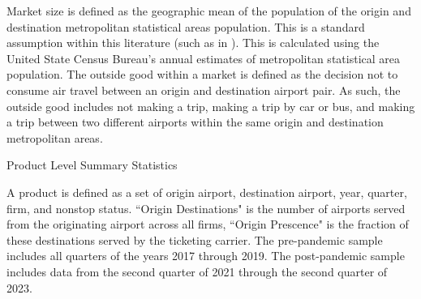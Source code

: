 \documentclass{article}
\begin{document}
	Market size is defined as the geographic mean of the population of the origin and destination metropolitan statistical areas population. This is a standard assumption within this literature (such as in \citep{ciliberto_market_2021}). This is calculated using the United State Census Bureau's annual estimates of metropolitan statistical area population. The outside good within a market is defined as the decision not to consume air travel between an origin and destination airport pair. As such, the outside good includes not making a trip, making a trip by car or bus, and making a trip between two different airports within the same origin and destination metropolitan areas. 
    

    \begin{table}
    \caption{Product Level Summary Statistics}
    \label{tab:Summary_Statistics_Product}
                    \vspace{-15mm}
                    \begin{center}
    
    \footnotesize{A product is defined as a set of origin airport, destination airport, year, quarter, firm, and nonstop status. ``Origin Destinations" is the number of airports served from the originating airport across all firms, ``Origin Prescence" is the fraction of these destinations served by the ticketing carrier. The pre-pandemic sample includes all quarters of the years 2017 through 2019. The post-pandemic sample includes data from the second quarter of 2021 through the second quarter of 2023.}
                    \end{center}
    \end{table}
\end{document}

